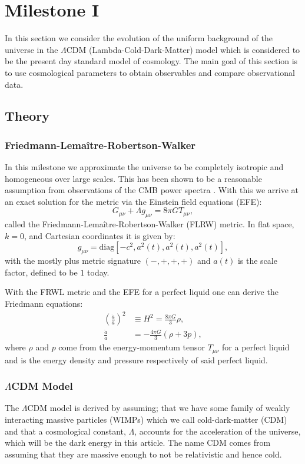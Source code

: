 \documentclass[%
reprint,
 amsmath,amssymb,
 aps,
]{revtex4-2}
\begin{document}
\section{Milestone I}

In this section we consider the evolution of the uniform background of the universe in the $\Lambda$CDM (Lambda-Cold-Dark-Matter) model which is considered to be the present day standard model of cosmology. The main goal of this section is to use cosmological parameters to obtain observables and compare observational data. 

\subsection{Theory}
\subsubsection{Friedmann-Lema\^itre-Robertson-Walker}
In this milestone we approximate the universe to be completely isotropic and homogeneous over large scales. This has been shown to be a reasonable assumption from observations of the CMB power spectra \cite{dodelson:2003ft}. With this we arrive at an exact solution for the metric via the Einstein field equations (EFE):
\begin{equation}
	G_{\mu\nu}+\Lambda g_{\mu\nu}=8\pi G T_{\mu\nu},\label{eq:EFE}
\end{equation}
called the Friedmann-Lema\^itre-Robertson-Walker (FLRW) metric. In flat space, $k=0$, and Cartesian coordinates it is given by:
\[g_{\mu\nu}=\text{diag}\left[-c^2,a^2(t),a^2(t),a^2(t)\right],\]
with the mostly plus metric signature $(-,+,+,+)$ and $a(t)$ is the scale factor, defined to be $1$ today. 

With the FRWL metric and the EFE for a perfect liquid one can derive the Friedmann equations:
\begin{align}
	\label{eq:F1}
	\left(\frac{\dot{a}}{a}\right)^2&\equiv H^2=\frac{8\pi G}{3}\rho,\\
	\label{eq:F2}
	\frac{\ddot{a}}{a}&=-\frac{4\pi G}{3}(\rho+3p),
\end{align}
where $\rho$ and $p$ come from the energy-momentum tensor $T_{\mu\nu}$ for a perfect liquid and is the energy density and pressure respectively of said perfect liquid. 
\subsubsection{$\Lambda$CDM Model}
The $\Lambda$CDM model is derived by assuming; that we have some family of weakly interacting massive particles (WIMPs) which we call cold-dark-matter (CDM) and that a cosmological constant, $\Lambda$, accounts for the acceleration of the universe, which will be the dark energy in this article. The name CDM comes from assuming that they are massive enough to not be relativistic and hence cold. 
\end{document}
